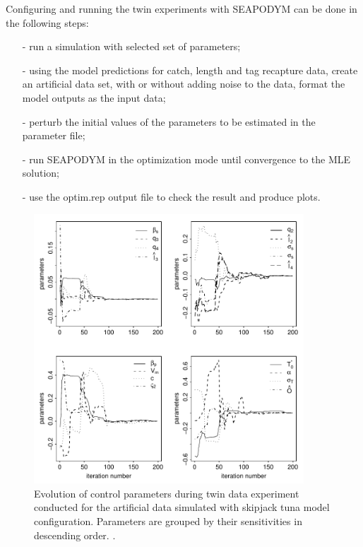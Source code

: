 Configuring and running the twin experiments with SEAPODYM  can be done in the following steps:
\begin{itemize}
 \item[-] run a simulation with selected set of parameters;
 \item[-] using the model predictions for catch, length and tag recapture data, create an artificial data set, with or without adding noise to the data, format the model outputs as the input data;
 \item[-] perturb the initial values of the parameters to be estimated in the parameter file;
 \item[-] run SEAPODYM in the optimization mode until convergence to the MLE solution;
 \item[-] use the optim.rep output file to check the result and produce plots. \\
\end{itemize}

\begin{figure}[H]
	\centering
		\includegraphics[width=0.9\textwidth]{chapter4/figs/twin_E2}
	\caption{Evolution of control parameters during twin data experiment conducted for the artificial data simulated with skipjack tuna model configuration. Parameters are grouped by their sensitivities in descending order. \citep*[From][]{Senina08}.}
	\label{fig:twinE2}
\end{figure}

